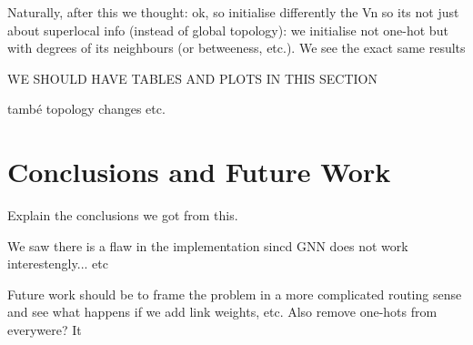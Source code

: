 \documentclass[10pt,twocolumn,letterpaper]{article}
\begin{document}
Naturally, after this we thought: ok, so initialise differently the Vn so its not just about superlocal info (instead of global topology): we initialise not one-hot but with degrees of its neighbours (or betweeness, etc.). We see the exact same results

WE SHOULD HAVE TABLES AND PLOTS IN THIS SECTION

també topology changes etc.



\section{Conclusions and Future Work}

Explain the conclusions we got from this.

We saw there is a flaw in the implementation sincd GNN does not work interestengly... etc

Future work should be to frame the problem in a more complicated routing sense and see what happens if we add link weights, etc. Also remove one-hots from everywere? It

{\small


}
\end{document}
